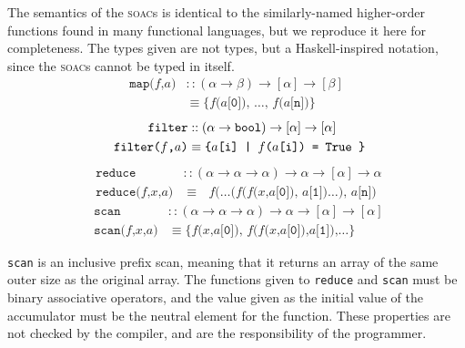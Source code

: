 The semantics of the \textsc{soac}s is identical to the similarly-named
higher-order functions found in many functional languages, but we
reproduce it here for completeness.  The types given are not \LO{}
types, but a Haskell-inspired notation, since the \textsc{soac}s cannot
be typed in \LO{} itself.
\begin{align*}
\texttt{map($f$,$a$)}
& :: (\alpha\rightarrow\beta)\rightarrow[\alpha]\rightarrow[\beta] \\
& \equiv \texttt{\{$f$($a$[0]), \ldots, $f$($a$[n])\}}
\end{align*}
\begin{align*}
\texttt{ filter}
& :: (\alpha\rightarrow\texttt{bool})\rightarrow[\alpha]\rightarrow[\alpha] \\
\texttt{ filter($f$,$a$)} & \equiv \texttt{\{$a$[i] | $f$($a$[i]) = \texttt{True }\}}
\end{align*}
\begin{align*}
\texttt{ reduce}
& :: (\alpha\rightarrow\alpha\rightarrow\alpha)\rightarrow\alpha\rightarrow[\alpha]\rightarrow\alpha \\
\texttt{ reduce($f$,$x$,$a$)} & \equiv \texttt{ $f$(\ldots($f$($f$($x$,$a$[0]), $a$[1])\ldots), $a$[n])}
\end{align*}
\begin{align*}
\texttt{ scan}
& :: (\alpha\rightarrow\alpha\rightarrow\alpha)\rightarrow\alpha\rightarrow[\alpha]\rightarrow[\alpha] \\
\texttt{ scan($f$,$x$,$a$)} & \equiv \texttt{\{$f$($x$,$a$[0]), $f$($f$($x$,$a$[0]),$a$[1]),\ldots\}}
\end{align*}

\texttt{scan} is an inclusive prefix scan, meaning that it returns an
array of the same outer size as the original array.  The functions
given to \texttt{reduce} and \texttt{scan} must be binary associative
operators, and the value given as the initial value of the accumulator
must be the neutral element for the function.  These properties are
not checked by the \LO{} compiler, and are the responsibility of the
programmer.

